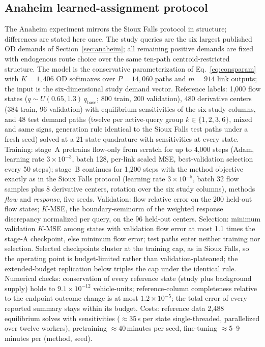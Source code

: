 \subsection{Anaheim learned-assignment protocol}\label{app:anaheimlearning}
The Anaheim experiment mirrors the Sioux Falls protocol in structure;
differences are stated here once. The study queries are the six largest
published OD demands of Section~\ref{sec:anaheim}; all remaining
positive demands are fixed with endogenous route choice over the same
ten-path centroid-restricted structure. The model is the conservative
parameterization of Eq.~\eqref{eq:consparam} with $K=1{,}406$ OD
softmaxes over $P=14{,}060$ paths and $m=914$ link outputs; the input
is the six-dimensional study demand vector. Reference labels: 1{,}000
flow states ($q\sim U(0.65,1.3)\,q_{\mathrm{base}}$; 800 train, 200
validation), 480 derivative centers (384 train, 96 validation) with
equilibrium sensitivities of the six study columns, and 48 test demand
paths (twelve per active-query group $k\in\{1,2,3,6\}$, mixed and same
signs, generation rule identical to the Sioux Falls test paths under a
fresh seed) solved at a 21-state quadrature with sensitivities at every
state. Training: stage~A pretrains flow-only from scratch for up to
4{,}000 steps (Adam, learning rate $3\times10^{-3}$, batch 128,
per-link scaled MSE, best-validation selection every 50 steps); stage~B
continues for 1{,}200 steps with the method objective exactly as in
the Sioux Falls protocol (learning rate $3\times10^{-5}$, batch 32
flow samples plus 8 derivative centers, rotation over the six study
columns), methods \emph{flow} and \emph{response}, five seeds.
Validation: flow relative error on the 200 held-out flow states;
$K$-MSE, the boundary-seminorm of the weighted response discrepancy
normalized per query, on the 96 held-out centers. Selection: minimum
validation $K$-MSE among states with validation flow error at most
1.1 times the stage-A checkpoint, else minimum flow error; test
paths enter neither training nor selection. Selected checkpoints
cluster at the training cap, as in Sioux Falls, so the operating
point is budget-limited rather than validation-plateaued; the
extended-budget replication below triples the cap under the identical
rule. Numerical checks: conservation of every reference state (study
plus background supply) holds to $9.1\times10^{-12}$ vehicle-units;
reference-column completeness relative to the endpoint outcome change
is at most $1.2\times10^{-5}$; the total error of every reported
summary stays within its budget. Costs: reference data 2{,}488
equilibrium solves with sensitivities ($\approx$35\,s per state
single-threaded, parallelized over twelve workers), pretraining
$\approx$40\,minutes per seed, fine-tuning $\approx$5--9\,minutes per
(method, seed).

